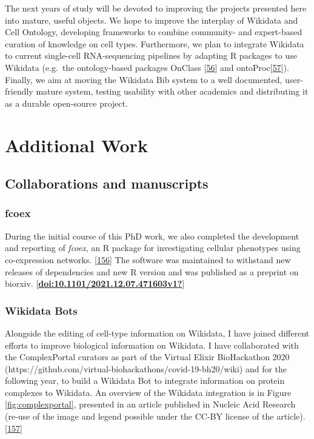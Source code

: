 The next years of study will be devoted to improving the projects presented here into mature, useful objects.
We hope to improve the interplay of Wikidata and Cell Ontology, developing frameworks to combine community- and expert-based curation of knowledge on cell types.
Furthermore, we plan to integrate Wikidata to current single-cell RNA-sequencing pipelines by adapting R packages to use Wikidata (e.g.~the ontology-based packages OnClass {[}\protect\hyperlink{ref-sW6aNZJB}{56}{]} and ontoProc{[}\protect\hyperlink{ref-15YmDXALp}{57}{]}).
Finally, we aim at moving the Wikidata Bib system to a well documented, user-friendly mature system, testing usability with other academics and distributing it as a durable open-source project.

\hypertarget{additional-work}{%
\section{Additional Work}\label{additional-work}}

\hypertarget{collaborations-and-manuscripts}{%
\subsection{Collaborations and manuscripts}\label{collaborations-and-manuscripts}}

\hypertarget{fcoex}{%
\subsubsection{fcoex}\label{fcoex}}

During the initial course of this PhD work, we also completed the development and reporting of \emph{fcoex}, an R package for investigating cellular phenotypes using co-expression networks. {[}\protect\hyperlink{ref-MxIeSJYt}{156}{]} The software was maintained to withstand new releases of dependencies and new R version and was published as a preprint on biorxiv. {[}\protect\hyperlink{ref-doi:10.1101ux2f2021.12.07.471603v1}{\textbf{doi:10.1101/2021.12.07.471603v1?}}{]}

\hypertarget{wikidata-bots}{%
\subsubsection{Wikidata Bots}\label{wikidata-bots}}

Alongside the editing of cell-type information on Wikidata, I have joined different efforts to improve biological information on Wikidata.
I have collaborated with the ComplexPortal curators as part of the Virtual Elixir BioHackathon 2020 (https://github.com/virtual-biohackathons/covid-19-bh20/wiki) and for the following year, to build a Wikidata Bot to integrate information on protein complexes to Wikidata. An overview of the Wikidata integration is in Figure \ref{fig:complexportal}, presented in an article published in Nucleic Acid Research (re-use of the image and legend possible under the CC-BY license of the article). {[}\protect\hyperlink{ref-CQRJ53gu}{157}{]}

